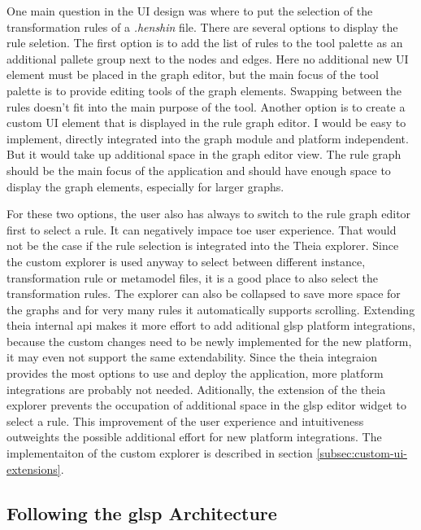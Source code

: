     One main question in the UI design was where to put the selection of the transformation rules of a \textit{.henshin} file. There are several options to display the rule seletion. The first option is to add the list of rules to the tool palette as an additional pallete group next to the nodes and edges. Here no additional new UI element must be placed in the graph editor, but the main focus of the tool palette is to provide editing tools of the graph elements. Swapping between the rules doesn't fit into the main purpose of the tool. Another option is to create a custom UI element that is displayed in the rule graph editor. I would be easy to implement, directly integrated into the graph module and platform independent. But it would take up additional space in the graph editor view. The rule graph should be the main focus of the application and should have enough space to display the graph elements, especially for larger graphs.

    For these two options, the user also has always to switch to the rule graph editor first to select a rule. It can negatively impace toe user experience. That would not be the case if the rule selection is integrated into the Theia explorer. Since the custom explorer is used anyway to select between different instance, transformation rule or metamodel files, it is a good place to also select the transformation rules. The explorer can also be collapsed to save more space for the graphs and for very many rules it automatically supports scrolling. Extending theia internal \acs{api} makes it more effort to add aditional \ac{glsp} platform integrations, because the custom changes need to be newly implemented for the new platform, it may even not support the same extendability. Since the theia integraion provides the most options to use and deploy the application, more platform integrations are probably not needed. Aditionally, the extension of the theia explorer prevents the occupation of additional space in the \ac{glsp} editor widget to select a rule. This improvement of the user experience and intuitiveness outweights the possible additional effort for new platform integrations. The implementaiton of the custom explorer is described in section \ref{subsec:custom-ui-extensions}.


  \subsection{Following the \ac{glsp} Architecture}
  \label{subsec:high-level-architecture}

